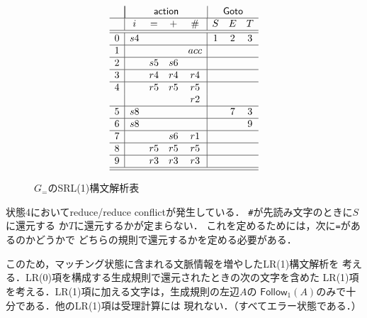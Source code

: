 \documentclass[a4j,dvipdfmx]{jbook}
\begin{document}
\begin{figure}[H]
  \[
    \begin{array}{c|cccc|ccc}
        & \multicolumn{4}{|c}{\mathsf{action}}
        & \multicolumn{3}{|c}{\mathsf{Goto}}                               \\\hline
        & i                                    & =  & +  & \#  & S & E & T \\\hline\hline
      0 & s4                                   &    &    &     & 1 & 2 & 3 \\\hline
      1 &                                      &    &    & acc &   &   &   \\\hline
      2 &                                      & s5 & s6 &     &   &   &   \\\hline
      3 &                                      & r4 & r4 & r4  &   &   &   \\\hline
      4 &                                      & r5 & r5 & r5  &   &   &   \\
        &                                      &    &    & r2  &   &   &   \\\hline
      5 & s8                                   &    &    &     &   & 7 & 3 \\\hline
      6 & s8                                   &    &    &     &   &   & 9 \\\hline
      7 &                                      &    & s6 & r1  &   &   &   \\\hline
      8 &                                      & r5 & r5 & r5  &   &   &   \\\hline
      9 &                                      & r3 & r3 & r3  &   &   &   \\\hline\hline
    \end{array}
  \]
  \caption{$G_{=}$のSRL(1)構文解析表}
\end{figure}

状態4においてreduce/reduce conflictが発生している．
\texttt{\#}が先読み文字のときに$S$に還元する
か$T$に還元するかが定まらない．
これを定めるためには，次に\texttt{=}があるのかどうかで
どちらの規則で還元するかを定める必要がある．

このため，マッチング状態に含まれる文脈情報を増やしたLR(1)構文解析を
考える．LR(0)項を構成する生成規則で還元されたときの次の文字を含めた
LR(1)項を考える．LR(1)項に加える文字は，生成規則の左辺$A$の
$\mathsf{Follow}_1(A)$のみで十分である．他のLR(1)項は受理計算には
現れない．（すべてエラー状態である．）
\end{document}
